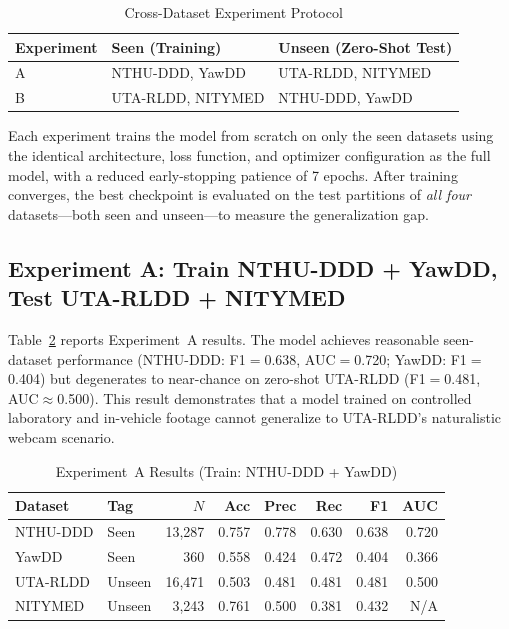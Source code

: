 \documentclass[journal]{IEEEtran}
\begin{document}
\begin{table}[t]
  \caption{Cross-Dataset Experiment Protocol}
  \label{tab:cross_protocol}
  \centering
  \small
  \begin{tabular}{lll}
    \toprule
    Experiment & Seen (Training) & Unseen (Zero-Shot Test) \\
    \midrule
    A & NTHU-DDD, YawDD  & UTA-RLDD, NITYMED \\
    B & UTA-RLDD, NITYMED & NTHU-DDD, YawDD \\
    \bottomrule
  \end{tabular}
\end{table}

Each experiment trains the model from scratch on only the seen datasets using the identical architecture, loss function, and optimizer configuration as the full model, with a reduced early-stopping patience of 7 epochs. After training converges, the best checkpoint is evaluated on the test partitions of \emph{all four} datasets---both seen and unseen---to measure the generalization gap.

\subsection{Experiment A: Train NTHU-DDD + YawDD, Test UTA-RLDD + NITYMED}
\label{sec:expA}

Table~\ref{tab:expA} reports Experiment~A results. The model achieves reasonable seen-dataset performance (NTHU-DDD: F1$=$0.638, AUC$=$0.720; YawDD: F1$=$0.404) but degenerates to near-chance on zero-shot UTA-RLDD (F1$=$0.481, AUC$\approx$0.500). This result demonstrates that a model trained on controlled laboratory and in-vehicle footage cannot generalize to UTA-RLDD's naturalistic webcam scenario.

\begin{table}[t]
  \caption{Experiment~A Results (Train: NTHU-DDD + YawDD)}
  \label{tab:expA}
  \centering
  \small
  \setlength{\tabcolsep}{3pt}
  \begin{tabular}{llrrrrrr}
    \toprule
    Dataset & Tag & $N$ & Acc & Prec & Rec & F1 & AUC \\
    \midrule
    NTHU-DDD & Seen   & 13{,}287 & 0.757 & 0.778 & 0.630 & 0.638 & 0.720 \\
    YawDD    & Seen   & 360      & 0.558 & 0.424 & 0.472 & 0.404 & 0.366 \\
    UTA-RLDD & Unseen & 16{,}471 & 0.503 & 0.481 & 0.481 & 0.481 & 0.500 \\
    NITYMED  & Unseen & 3{,}243  & 0.761 & 0.500 & 0.381 & 0.432 & N/A  \\
    \bottomrule
  \end{tabular}
\end{table}
\end{document}
